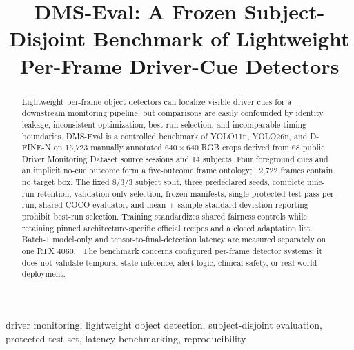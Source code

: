 \documentclass[conference]{IEEEtran}
\begin{document}
\title{DMS-Eval: A Frozen Subject-Disjoint Benchmark of Lightweight Per-Frame Driver-Cue Detectors}

\author{
\and
{}
}

\maketitle

\begin{abstract}
Lightweight per-frame object detectors can localize visible driver cues for a downstream monitoring pipeline, but comparisons are easily confounded by identity leakage, inconsistent optimization, best-run selection, and incomparable timing boundaries. DMS-Eval is a controlled benchmark of YOLO11n, YOLO26n, and D-FINE-N on 15,723 manually annotated $640\times640$ RGB crops derived from 68 public Driver Monitoring Dataset source sessions and 14 subjects. Four foreground cues and an implicit no-cue outcome form a five-outcome frame ontology; 12,722 frames contain no target box. The fixed 8/3/3 subject split, three predeclared seeds, complete nine-run retention, validation-only selection, frozen manifests, single protected test pass per run, shared COCO evaluator, and mean $\pm$ sample-standard-deviation reporting prohibit best-run selection. Training standardizes shared fairness controls while retaining pinned architecture-specific official recipes and a closed adaptation list. Batch-1 model-only and tensor-to-final-detection latency are measured separately on one RTX 4060. \AbstractResultSentence\ The benchmark concerns configured per-frame detector systems; it does not validate temporal state inference, alert logic, clinical safety, or real-world deployment.
\end{abstract}

\begin{IEEEkeywords}
driver monitoring, lightweight object detection, subject-disjoint evaluation, protected test set, latency benchmarking, reproducibility
\end{IEEEkeywords}
\end{document}
